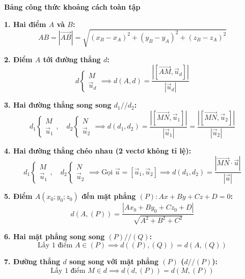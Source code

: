 \documentclass[12pt,a4paper]{article}
\begin{document}
\begin{theorybox}
    \textbf{\textcolor{deepblue}{\large Bảng công thức khoảng cách toàn tập}}
    \setlength{\lineskip}{6pt}
    \par\vspace{8pt}

    \textbf{\textcolor{amberorange}{1. Hai điểm $A$ và $B$:}}
    \[
        AB = |\vec{AB}| = \sqrt{(x_B - x_A)^2 + (y_B - y_A)^2 + (z_B - z_A)^2}
    \]

    \textbf{\textcolor{amberorange}{2. Điểm $A$ tới đường thẳng $d$:}}
    \[
        d \begin{cases} M \\ \vec{u}_d \end{cases} \implies d(A, d) = \frac{\left| [\vec{AM}, \vec{u}_d] \right|}{|\vec{u}_d|}
    \]

    \textbf{\textcolor{amberorange}{3. Hai đường thẳng song song $d_1 // d_2$:}}
    \[
        d_1 \begin{cases} M \\ \vec{u}_1 \end{cases}, \quad d_2 \begin{cases} N \\ \vec{u}_2 \end{cases} 
        \implies d(d_1, d_2) = \frac{\left| [\vec{MN}, \vec{u}_1] \right|}{|\vec{u}_1|} = \frac{\left| [\vec{MN}, \vec{u}_2] \right|}{|\vec{u}_2|}
    \]

    \textbf{\textcolor{amberorange}{4. Hai đường thẳng chéo nhau (2 vectơ không tỉ lệ):}}
    \[
        d_1 \begin{cases} M \\ \vec{u}_1 \end{cases}, \quad d_2 \begin{cases} N \\ \vec{u}_2 \end{cases}
        \implies \text{Gọi } \vec{u} = [\vec{u}_1, \vec{u}_2] \implies d(d_1, d_2) = \frac{\left| \vec{MN} \cdot \vec{u} \right|}{|\vec{u}|}
    \]

    \textbf{\textcolor{amberorange}{5. Điểm $A(x_0; y_0; z_0)$ đến mặt phẳng $(P)\colon Ax + By + Cz + D = 0$:}}
    \[
        d(A, (P)) = \frac{|Ax_0 + By_0 + Cz_0 + D|}{\sqrt{A^2 + B^2 + C^2}}
    \]

    \textbf{\textcolor{amberorange}{6. Hai mặt phẳng song song $(P) // (Q)$:}}
    \[
        \text{Lấy 1 điểm } A \in (P) \implies d((P), (Q)) = d(A, (Q))
    \]

    \textbf{\textcolor{amberorange}{7. Đường thẳng $d$ song song với mặt phẳng $(P)$ ($d // (P)$):}}
    \[
        \text{Lấy 1 điểm } M \in d \implies d(d, (P)) = d(M, (P))
    \]
\end{theorybox}
\end{document}
